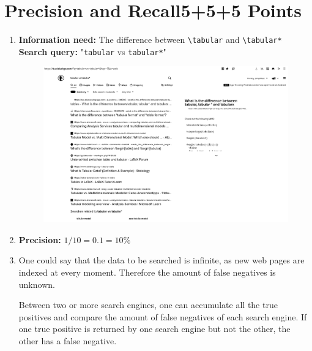 \documentclass[10pt,a4paper]{article}
\begin{document}
\section{\hfill Precision and Recall\hfill 5+5+5 Points}
\begin{enumerate}
    \item \textbf{Information need:} The difference between \texttt{\textbackslash tabular} and \texttt{\textbackslash tabular*}\\
        \textbf{Search query:} "\texttt{tabular} vs \texttt{tabular*}"
        \begin{figure}[h]
            \centering
            \includegraphics[width=\linewidth]{e03screenshot.indexed}
        \end{figure}
    \item \textbf{Precision:} $1/10=0.1=10\% $
    \item One could say that the data to be searched is infinite, as new web pages are indexed at every moment. Therefore the amount of false negatives is unknown.
    
    Between two or more search engines, one can accumulate all the true positives and compare the amount of false negatives of each search engine. If one true positive is returned by one search engine but not the other, the other has a false negative.
\end{enumerate}


\newpage
\end{document}
